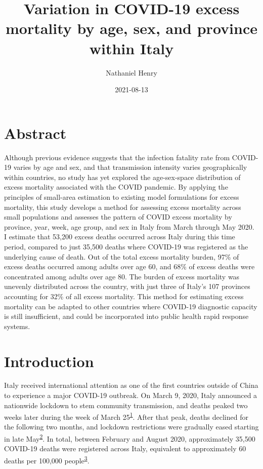 \documentclass[
]{article}
\title{Variation in COVID-19 excess mortality by age, sex, and province within Italy}
\author{Nathaniel Henry\textsuperscript{}}
\date{2021-08-13}
\begin{document}
\maketitle

\hypertarget{abstract}{%
\section{Abstract}\label{abstract}}

Although previous evidence suggests that the infection fatality rate from COVID-19 varies by age and sex, and that transmission intensity varies geographically within countries, no study has yet explored the age-sex-space distribution of excess mortality associated with the COVID pandemic. By applying the principles of small-area estimation to existing model formulations for excess mortality, this study develops a method for assessing excess mortality across small populations and assesses the pattern of COVID excess mortality by province, year, week, age group, and sex in Italy from March through May 2020. I estimate that 53,200 excess deaths occurred across Italy during this time period, compared to just 35,500 deaths where COVID-19 was registered as the underlying cause of death. Out of the total excess mortality burden, 97\% of excess deaths occurred among adults over age 60, and 68\% of excess deaths were concentrated among adults over age 80. The burden of excess mortality was unevenly distributed across the country, with just three of Italy's 107 provinces accounting for 32\% of all excess mortality. This method for estimating excess mortality can be adapted to other countries where COVID-19 diagnostic capacity is still insufficient, and could be incorporated into public health rapid response systems.

\hypertarget{introduction}{%
\section{Introduction}\label{introduction}}

Italy received international attention as one of the first countries outside of China to experience a major COVID-19 outbreak. On March 9, 2020, Italy announced a nationwide lockdown to stem community transmission, and deaths peaked two weeks later during the week of March 25\textsuperscript{\protect\hyperlink{ref-Sebastiani2020}{1}}⁠. After that peak, deaths declined for the following two months, and lockdown restrictions were gradually eased starting in late May\textsuperscript{\protect\hyperlink{ref-Alicandro2020}{2}}⁠. In total, between February and August 2020, approximately 35,500 COVID-19 deaths were registered across Italy, equivalent to approximately 60 deaths per 100,000 people\textsuperscript{\protect\hyperlink{ref-InstituteforHealthMetricsandEvaluationIHME2020}{3}}.
\end{document}
